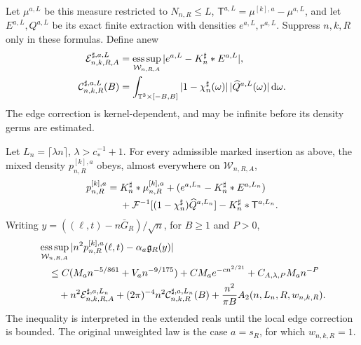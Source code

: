 Let $\mu^{a,L}$ be this measure restricted to $N_{n,R}\le L$,
$\mathsf T^{a,L}=\mu^{[k],a}-\mu^{a,L}$, and let $E^{a,L},Q^{a,L}$
be its exact finite extraction with densities $e^{a,L},r^{a,L}$.
Suppress $n,k,R$ only in these formulas. Define anew
\begin{align}
 \mathcal E^{\sharp,a,L}_{n,k,R,A}
 &=\mathop{\rm ess\,sup}_{\mathcal W_{n,R,A}}
            |e^{a,L}-K_n^\sharp*E^{a,L}|,\notag\\
 \mathcal C^{\sharp,a,L}_{n,k,R}(B)
 &=\int_{\T^3\times[-B,B]}
          |1-\chi_n^\sharp(\omega)|\,|\widehat Q^{a,L}(\omega)|\dd\omega.
 \label{eq:sharp-weighted-raw-terms}
\end{align}
The edge correction is kernel-dependent, and may be infinite before
its density germs are estimated.

\begin{theorem}
\label{thm:sharp-weighted-raw-inversion}
Let $L_n=\lceil\lambda n\rceil$, $\lambda>c_*^{-1}+1$.
For every admissible marked insertion as above, the mixed density
$p_{n,R}^{[k],a}$ obeys, almost everywhere on $\mathcal W_{n,R,A}$,
\begin{align}
 p_{n,R}^{[k],a}={}&K_n^\sharp*\mu_{n,R}^{[k],a}
      +(e^{a,L_n}-K_n^\sharp*E^{a,L_n})\notag\\
 &+\mathcal F^{-1}[(1-\chi_n^\sharp)\widehat Q^{a,L_n}]
                -K_n^\sharp*\mathsf T^{a,L_n}.
 \label{eq:sharp-weighted-raw-inversion}
\end{align}
Writing $y=((\ell,t)-n\bar G_R)/\sqrt n$, for $B\ge1$ and $P>0$,
\begin{align}
 &\mathop{\rm ess\,sup}_{\mathcal W_{n,R,A}}
       |n^2p_{n,R}^{[k],a}(\ell,t)-\alpha_a\mathfrak g_R(y)|\notag\\
 &\quad\le C(M_an^{-5/861}+V_an^{-9/175})
           +CM_ae^{-c n^{2/21}}+C_{A,\lambda,P}M_an^{-P}\notag\\
 &\qquad+n^2\mathcal E^{\sharp,a,L_n}_{n,k,R,A}
       +(2\pi)^{-4}n^2\mathcal C^{\sharp,a,L_n}_{n,k,R}(B)
       +\frac{n^2}{\pi B}A_2(n,L_n,R,w_{n,k,R}).
 \label{eq:sharp-weighted-raw-budget}
\end{align}
The inequality is interpreted in the extended reals until the local
edge correction is bounded. The original unweighted law is the case
$a=s_R$, for which $w_{n,k,R}=1$.
\end{theorem}
